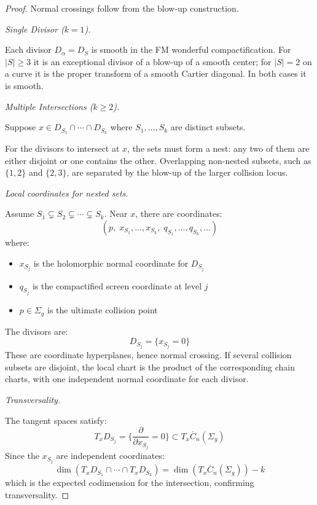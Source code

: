 \begin{proof}
Normal crossings follow from the blow-up construction.

\medskip
\noindent\emph{Single Divisor ($k=1$).}

Each divisor $D_\alpha=D_S$ is smooth in the FM wonderful
compactification. For $|S|\geq3$ it is an exceptional divisor of a
blow-up of a smooth center; for $|S|=2$ on a curve it is the proper
transform of a smooth Cartier diagonal. In both cases it is smooth.

\medskip
\noindent\emph{Multiple Intersections ($k \geq 2$).}

Suppose $x \in D_{S_1} \cap \cdots \cap D_{S_k}$ where $S_1, \ldots, S_k$ are distinct subsets.

For the divisors to intersect at $x$, the sets must form a nest: any
two of them are either disjoint or one contains the other. Overlapping
non-nested subsets, such as $\{1,2\}$ and $\{2,3\}$, are separated by
the blow-up of the larger collision locus.

\emph{Local coordinates for nested sets.}

Assume $S_1 \subsetneq S_2 \subsetneq \cdots \subsetneq S_k$. Near
$x$, there are coordinates:
\[
(p,\;x_{S_1},\ldots,x_{S_k},\;q_{S_1},\ldots,q_{S_k},\ldots)
\]
where:
\begin{itemize}
\item $x_{S_j}$ is the holomorphic normal coordinate for $D_{S_j}$
\item $q_{S_j}$ is the compactified screen coordinate at level $j$
\item $p \in \Sigma_g$ is the ultimate collision point
\end{itemize}

The divisors are:
\[D_{S_j} = \{x_{S_j} = 0\}\]
These are coordinate hyperplanes, hence normal crossing.
If several collision subsets are disjoint, the local chart is the
product of the corresponding chain charts, with one independent
normal coordinate for each divisor.

\medskip
\noindent\emph{Transversality.}

The tangent spaces satisfy:
\[T_x D_{S_j} = \{\frac{\partial}{\partial x_{S_j}} = 0\} \subset T_x \overline{C}_n(\Sigma_g)\]
Since the $x_{S_j}$ are independent coordinates:
\[\dim(T_x D_{S_1} \cap \cdots \cap T_x D_{S_k}) = \dim(T_x \overline{C}_n(\Sigma_g)) - k\]
which is the expected codimension for the intersection, confirming transversality.
\end{proof}

